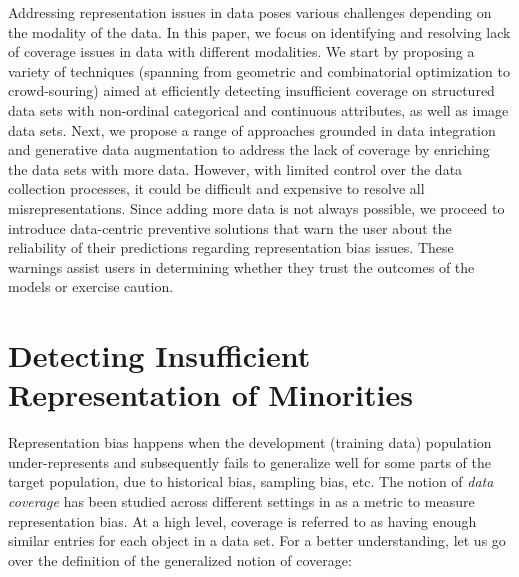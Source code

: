 \documentclass[11pt]{article}
\begin{document}
Addressing representation issues in data poses various challenges depending on the modality of the data. In this paper, we focus on identifying and resolving lack of coverage issues in data with different modalities.
We start by proposing a variety of techniques (spanning from geometric and combinatorial optimization to crowd-souring) aimed at efficiently detecting insufficient coverage on structured data sets with non-ordinal categorical and continuous attributes, as well as image data sets. Next, we propose a range of approaches grounded in data integration and generative data augmentation to address the lack of coverage by enriching the data sets with more data. However, with limited control over the data collection processes, it could be difficult and expensive to resolve all misrepresentations. 
Since adding more data is not always possible, we proceed to introduce data-centric preventive solutions that warn the user about the reliability of their predictions regarding representation bias issues. These warnings assist users in determining whether they trust the outcomes of the models or exercise caution. 

\section{Detecting Insufficient Representation of Minorities}\label{sec:identification} %
Representation bias happens when the development (training data) population under-represents 
and subsequently fails to generalize well 
for some parts of the target population, due to historical bias, sampling bias, etc.
The notion of {\it data coverage} has been studied across different settings in \cite{shahbazi2023representation} as a metric to measure representation bias. At a high level, coverage is referred to as having enough similar entries for each object in a data set. 
For a better understanding, let us go over the definition of the generalized notion of coverage:
\end{document}
